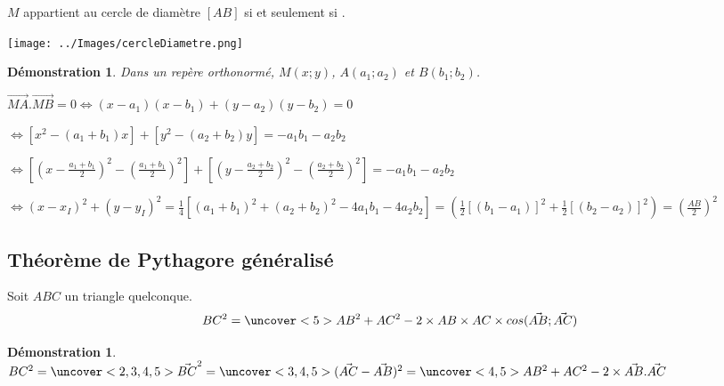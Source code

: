 \documentclass{beamer}
\theoremstyle{plain}
\newtheorem{demonstration}[theorem]{Démonstration}
\begin{document}
\begin{frame}
\begin{theorem}
 $M$ appartient au cercle de diamètre $[AB]$ si et seulement si 
 .
 
      \begin{center}
    \texttt{[image: ../Images/cercleDiametre.png]}
  \end{center}
\end{theorem}
\end{frame}
\begin{frame}
\begin{demonstration}
 Dans un repère orthonormé, $M(x;y)$, $A(a_1;a_2)$ et $B(b_1;b_2)$.
 
 $\vec{MA}.\vec{MB}=0 \Leftrightarrow (x-a_1)(x-b_1)+(y-a_2)(y-b_2)=0$
 
 $\Leftrightarrow [x^2-(a_1+b_1)x]+[y^2-(a_2+b_2)y]=-a_1b_1-a_2b_2$
 
 $\Leftrightarrow [(x-\frac{a_1+b_1}{2})^2-(\frac{a_1+b_1}{2})^2]+[(y-\frac{a_2+b_2}{2})^2-(\frac{a_2+b_2}{2})^2]=-a_1b_1-a_2b_2$
 
 $\Leftrightarrow (x-x_I)^2+(y-y_I)^2=\frac{1}{4}[(a_1+b_1)^2+(a_2+b_2)^2-4a_1b_1-4a_2b_2]=(\frac{1}{2}[(b_1-a_1)]^2+\frac{1}{2}[(b_2-a_2)]^2)=(\frac{AB}{2})^2$
\end{demonstration}
\end{frame}

\subsection{Théorème de Pythagore généralisé}

\begin{frame}
\begin{theorem}
 Soit $ABC$ un triangle quelconque. 
 $$BC^2=\uncover<5>{AB^2+AC^2-2 \times AB\times AC\times cos(\vec{AB};\vec{AC})}$$
 
\end{theorem}

\begin{demonstration}
 $BC^2=\uncover<2,3,4,5>{\vec{BC}^2}=
 \uncover<3,4,5>{(\vec{AC}-\vec{AB})^2}=\uncover<4,5>{AB^2+AC^2-2\times \vec{AB}.\vec{AC}}$
\end{demonstration}
\end{frame}

\end{document}
